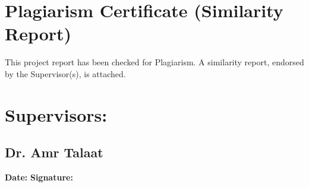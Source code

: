 \newpage
\section*{Plagiarism Certificate (Similarity Report)}
 This project report has been checked for Plagiarism. A similarity report, endorsed by the Supervisor(s), is attached.
\vspace{2cm}
\section*{Supervisors:}
\vspace{0.3cm}
\subsection*{Dr. Amr Talaat}
\vspace{0.3cm}
\textbf{Date:}
\hspace{4cm}
\textbf{Signature:}